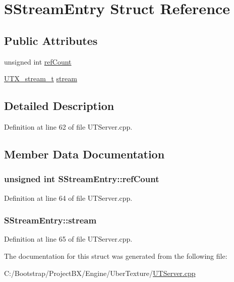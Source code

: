 \hypertarget{struct_s_stream_entry}{
\section{SStreamEntry Struct Reference}
\label{struct_s_stream_entry}
}
\subsection*{Public Attributes}
\begin{CompactItemize}
\item 
unsigned int \hyperlink{struct_s_stream_entry_39bcff0982ffa41d4d915bb908721866}{refCount}
\item 
\hyperlink{struct_u_t_x__stream__t}{UTX\_\-stream\_\-t} \hyperlink{struct_s_stream_entry_6deee14b0b32bdc7b6d51994ef014e9a}{stream}
\end{CompactItemize}


\subsection{Detailed Description}


Definition at line 62 of file UTServer.cpp.

\subsection{Member Data Documentation}
\hypertarget{struct_s_stream_entry_39bcff0982ffa41d4d915bb908721866}{
\subsubsection[{refCount}]{\setlength{\rightskip}{0pt plus 5cm}unsigned int {\bf SStreamEntry::refCount}}}
\label{struct_s_stream_entry_39bcff0982ffa41d4d915bb908721866}




Definition at line 64 of file UTServer.cpp.\hypertarget{struct_s_stream_entry_6deee14b0b32bdc7b6d51994ef014e9a}{
\subsubsection[{stream}]{ {\bf SStreamEntry::stream}}}
\label{struct_s_stream_entry_6deee14b0b32bdc7b6d51994ef014e9a}




Definition at line 65 of file UTServer.cpp.

The documentation for this struct was generated from the following file:\begin{CompactItemize}
\item 
C:/Bootstrap/ProjectBX/Engine/UberTexture/\hyperlink{_u_t_server_8cpp}{UTServer.cpp}\end{CompactItemize}
